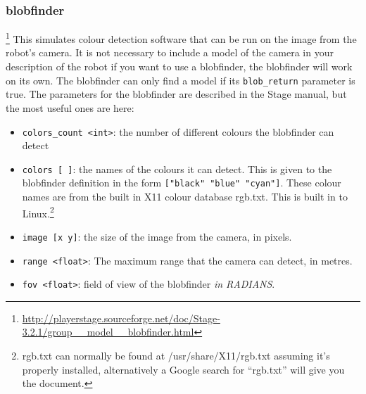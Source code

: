 \documentclass[a4paper]{report}
\begin{document}
\subsubsection{blobfinder}\footnote{\url{http://playerstage.sourceforge.net/doc/Stage-3.2.1/group__model__blobfinder.html}}
This simulates colour detection software that can be run on the image from the robot's camera. It is not necessary to include a model of the camera in your description of the robot if you want to use a blobfinder, the blobfinder will work on its own. The blobfinder can only find a model if its \verb|blob_return| parameter is true. The parameters for the blobfinder are described in the Stage manual, but the most useful ones are here:
\begin{itemize}
\item \verb|colors_count <int>|: the number of different colours the blobfinder can detect
\item \verb|colors [ ]|: the names of the colours it can detect. This is given to the blobfinder definition in the form \verb|["black" "blue" "cyan"]|. These colour names are from the built in X11 colour database rgb.txt. This is built in to Linux.\footnote{rgb.txt can normally be found at /usr/share/X11/rgb.txt assuming it's properly installed, alternatively a Google search for ``rgb.txt'' will give you the document.}
\item \verb|image [x y]|: the size of the image from the camera, in pixels.
\item \verb|range <float>|: The maximum range that the camera can detect, in metres.
\item \verb|fov <float>|: field of view of the blobfinder \emph{in RADIANS}.
\end{itemize}
\end{document}
